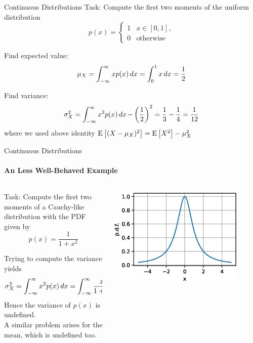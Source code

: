 {\begin{frame}{Continuous Distributions}
        Task: Compute the first two moments of the uniform distribution
        $$
            p(x) = \begin{cases}
                1 & x \in [0,1],     \\
                0 & \text{otherwise}
            \end{cases}
        $$
        \vspace*{5mm}

        Find expected value:
        $$\mu_X = \int_{-\infty}^\infty xp(x) \mathop{dx} = \int_0^1 x \mathop{dx} = \frac{1}{2}$$

        Find variance:
        $$\sigma_X^2 = \int_{-\infty}^\infty x^2p(x) \mathop{dx} - \left(\frac{1}{2}\right)^2
            = \frac{1}{3} - \frac{1}{4} = \frac{1}{12}
        $$
        where we used above identity $\operatorname{E}\left[(X-\mu_X)^2\right] = \operatorname{E}\left[X^2\right] - \mu_X^2$
    \end{frame}

    \begin{frame}{Continuous Distributions}
        \framesubtitle{An Less Well-Behaved Example}

        \begin{columns}[onlytextwidth]
            \begin{column}{0.55\textwidth}
                Task: Compute the first two moments of a Cauchy-like distribution with the PDF given by
                $$p(x) = \frac{1}{1+x^2}$$
                \vspace*{3mm}

                Trying to compute the variance yields
                $$\sigma_X^2 = \int_{-\infty}^\infty x^2p(x) \mathop{dx}
                    = \int_{-\infty}^\infty \frac{x^2}{1+x^2} \mathop{dx} = \infty
                $$
                Hence the variance of $p(x)$ is undefined.\\[3mm]

                A similar problem arises for the mean, which is undefined too.
            \end{column}
            \begin{column}{0.45\textwidth}
                \begin{center}
                    \includegraphics[width=0.85\textwidth]{fig/prob_cauchy.eps}
                \end{center}
            \end{column}
        \end{columns}



\end{frame}}
